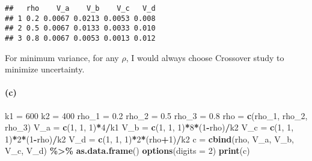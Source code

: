 \documentclass[
]{article}
\newenvironment{Shaded}{\begin{snugshade}}{\end{snugshade}}
\newcommand{\AttributeTok}[1]{\textcolor[rgb]{0.13,0.29,0.53}{#1}}
\newcommand{\DecValTok}[1]{\textcolor[rgb]{0.00,0.00,0.81}{#1}}
\newcommand{\FloatTok}[1]{\textcolor[rgb]{0.00,0.00,0.81}{#1}}
\newcommand{\FunctionTok}[1]{\textcolor[rgb]{0.13,0.29,0.53}{\textbf{#1}}}
\newcommand{\NormalTok}[1]{#1}
\newcommand{\OtherTok}[1]{\textcolor[rgb]{0.56,0.35,0.01}{#1}}
\newcommand{\SpecialCharTok}[1]{\textcolor[rgb]{0.81,0.36,0.00}{\textbf{#1}}}
\begin{document}
\begin{verbatim}
##   rho    V_a    V_b    V_c   V_d
## 1 0.2 0.0067 0.0213 0.0053 0.008
## 2 0.5 0.0067 0.0133 0.0033 0.010
## 3 0.8 0.0067 0.0053 0.0013 0.012
\end{verbatim}

For minimum variance, for any \(\rho\), I would always choose Crossover
study to minimize uncertainty.

\hypertarget{c}{%
\paragraph{(c)}\label{c}}

\begin{Shaded}
\begin{Highlighting}[]
\NormalTok{k1 }\OtherTok{=} \DecValTok{600}
\NormalTok{k2 }\OtherTok{=} \DecValTok{400}
\NormalTok{rho\_1 }\OtherTok{=} \FloatTok{0.2}
\NormalTok{rho\_2 }\OtherTok{=} \FloatTok{0.5}
\NormalTok{rho\_3 }\OtherTok{=} \FloatTok{0.8}
\NormalTok{rho }\OtherTok{=} \FunctionTok{c}\NormalTok{(rho\_1, rho\_2, rho\_3)}
\NormalTok{V\_a }\OtherTok{=} \FunctionTok{c}\NormalTok{(}\DecValTok{1}\NormalTok{, }\DecValTok{1}\NormalTok{, }\DecValTok{1}\NormalTok{)}\SpecialCharTok{*}\DecValTok{4}\SpecialCharTok{/}\NormalTok{k1}
\NormalTok{V\_b }\OtherTok{=} \FunctionTok{c}\NormalTok{(}\DecValTok{1}\NormalTok{, }\DecValTok{1}\NormalTok{, }\DecValTok{1}\NormalTok{)}\SpecialCharTok{*}\DecValTok{8}\SpecialCharTok{*}\NormalTok{(}\DecValTok{1}\SpecialCharTok{{-}}\NormalTok{rho)}\SpecialCharTok{/}\NormalTok{k2}
\NormalTok{V\_c }\OtherTok{=} \FunctionTok{c}\NormalTok{(}\DecValTok{1}\NormalTok{, }\DecValTok{1}\NormalTok{, }\DecValTok{1}\NormalTok{)}\SpecialCharTok{*}\DecValTok{2}\SpecialCharTok{*}\NormalTok{(}\DecValTok{1}\SpecialCharTok{{-}}\NormalTok{rho)}\SpecialCharTok{/}\NormalTok{k2}
\NormalTok{V\_d }\OtherTok{=} \FunctionTok{c}\NormalTok{(}\DecValTok{1}\NormalTok{, }\DecValTok{1}\NormalTok{, }\DecValTok{1}\NormalTok{)}\SpecialCharTok{*}\DecValTok{2}\SpecialCharTok{*}\NormalTok{(rho}\SpecialCharTok{+}\DecValTok{1}\NormalTok{)}\SpecialCharTok{/}\NormalTok{k2}
\NormalTok{c  }\OtherTok{=} \FunctionTok{cbind}\NormalTok{(rho, V\_a, V\_b, V\_c, V\_d) }\SpecialCharTok{\%\textgreater{}\%} \FunctionTok{as.data.frame}\NormalTok{()}
\FunctionTok{options}\NormalTok{(}\AttributeTok{digits =} \DecValTok{2}\NormalTok{)}
\FunctionTok{print}\NormalTok{(c)}
\end{Highlighting}
\end{Shaded}
\end{document}
